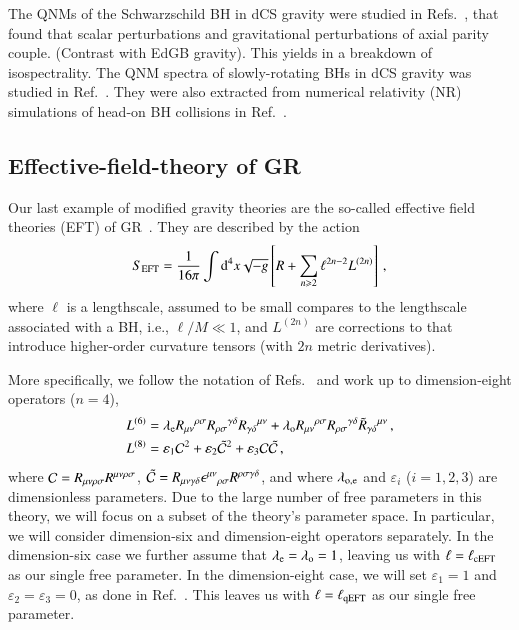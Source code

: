 \documentclass[twocolumn,
               prd,
               aps,
               superscriptaddress,
               tightenlines,
               nofootinbib,
               eqsecnum,
               amsfonts,
               amsmath,
               longbibliography]{revtex4-1}
\newcommand{\dd}{{\rm d}}
\newcommand{\lame}{\lambda_{\rm e}}
\newcommand{\lamo}{\lambda_{\rm o}}
\begin{document}
The QNMs of the Schwarzschild BH in dCS gravity were studied in
Refs.~\cite{Yunes:2007ss,Cardoso:2009pk,Molina:2010fb}, that found that scalar
perturbations and gravitational perturbations of axial parity couple. (Contrast
with EdGB gravity).
%
This yields in a breakdown of isospectrality. The QNM spectra of slowly-rotating BHs in dCS gravity was
studied in Ref.~\cite{Wagle:2021tam}.
%
They were also extracted from numerical relativity (NR) simulations of head-on BH collisions
in Ref.~\cite{Okounkova:2019dfo}.

\subsection{Effective-field-theory of GR}

Our last example of modified gravity theories are the so-called effective field
theories (EFT) of GR~\cite{Endlich:2017tqa,Sennett:2019bpc,deRham:2020ejn,Cano:2020cao,Cano:2021myl}.
%
They are described by the action
%
\begin{equation} \label{eq:action_eft}
    S_{\rm EFT} = \frac{1}{16 \pi}
    \int \dd^4x \sqrt{-g}
    \left[ R
    +
    \sum_{n \geqslant 2} \ell^{2n - 2} L^{(2n)}
    \right]\,,
\end{equation}
%
where $\ell$ is a lengthscale, assumed to be small compares to the lengthscale
associated with a BH, i.e., $\ell / M \ll 1$, and $L^{(2n)}$ are corrections to
that introduce higher-order curvature tensors (with $2n$ metric derivatives).

More specifically, we follow the notation of
Refs.~\cite{Cano:2020cao,Cano:2021myl} and work up to dimension-eight operators
($n=4$),
%
\begin{subequations}
\label{eq:action_mods}
\begin{align}
    L^{(6)} &= \lame R_{\mu\nu}{}^{\rho\sigma} R_{\rho\sigma}{}^{\gamma\delta} R_{\gamma \delta}{}^{\mu\nu}
    + \lamo R_{\mu\nu}{}^{\rho\sigma} R_{\rho\sigma}{}^{\gamma\delta} \tilde{R}_{\gamma \delta}{}^{\mu\nu}\,,
    \label{eq:s_6}
    \\
    L^{(8)} &= \varepsilon_{1} \mathcal{C}^2
    + \varepsilon_{2} \tilde{\mathcal{C}}^{2}
    + \varepsilon_{3} \mathcal{C} \tilde{\mathcal{C}}\,,
\label{eq:s_8}
\end{align}
\end{subequations}
%
where ${\cal C} = R_{\mu\nu\rho\sigma} R^{\mu\nu\rho\sigma}$,
$\tilde{\cal C} = R_{\mu\nu\gamma\delta} \epsilon^{\mu\nu}{}_{\rho\sigma} R^{\rho\sigma\gamma\delta}$,
and where $\lambda_{\rm o, e}$ and $\varepsilon_{i}$ ($i=1,2,3$) are dimensionless parameters.
%
Due to the large number of free parameters in this theory, we will focus on a subset of the theory's
parameter space.
%
In particular, we will consider dimension-six and dimension-eight operators separately.
%
In the dimension-six case we further assume that $\lame = \lamo = 1$, leaving us with $\ell = \ell_{\rm cEFT}$
as our single free parameter.
%
In the dimension-eight case, we will set $\varepsilon_{1} = 1$ and $\varepsilon_{2} = \varepsilon_{3} = 0$,
as done in Ref.~\cite{Sennett:2019bpc}.
%
This leaves us with $\ell = \ell_{\rm qEFT}$ as our single free parameter.
\end{document}
